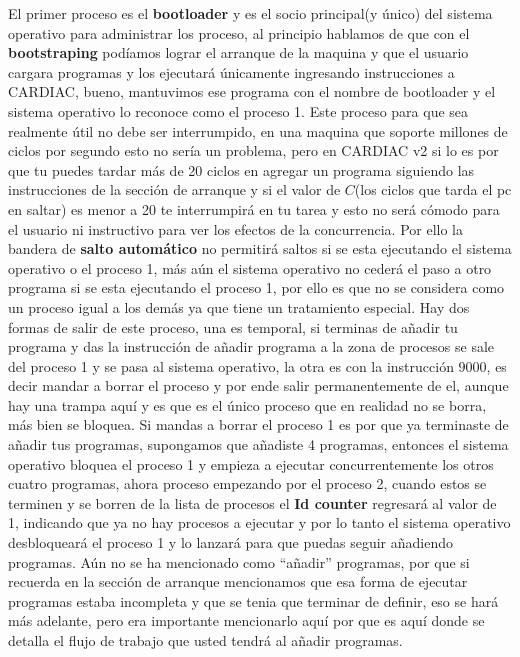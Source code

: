 \documentclass[12pt]{article}
\begin{document}
	El primer proceso es el \textbf{bootloader} y es el socio principal(y único) del sistema operativo para administrar
	los proceso, al principio hablamos de que con el \textbf{bootstraping} podíamos lograr el arranque de la maquina y
	que el usuario cargara programas y los ejecutará únicamente ingresando instrucciones a CARDIAC, bueno, mantuvimos
	ese programa con el nombre de bootloader y el sistema operativo lo reconoce como el proceso 1. Este proceso para que
	sea realmente útil no debe ser interrumpido, en una maquina que soporte millones de ciclos por segundo esto no sería un
	problema, pero en CARDIAC v2 si lo es por que tu puedes tardar más de 20 ciclos en agregar un programa siguiendo las instrucciones
	de la sección de arranque y si el valor de $C$(los ciclos que tarda el pc en saltar) es menor a 20 te interrumpirá en tu tarea
	y esto no será cómodo para el usuario ni instructivo para ver los efectos de la concurrencia. Por ello la bandera de 
	\textbf{salto automático} no permitirá saltos si se esta ejecutando el sistema operativo o el proceso 1, más aún el
	sistema operativo no cederá el paso a otro programa si se esta ejecutando el proceso 1, por ello es que no se considera
	como un proceso igual a los demás ya que tiene un tratamiento especial. Hay dos formas de salir de este proceso, una es
	temporal, si terminas de añadir tu programa y das la instrucción de añadir programa a la zona de procesos se sale del proceso 1
	y se pasa al sistema operativo, la otra es con la instrucción $9000$, es decir mandar a borrar el proceso y por ende salir
	permanentemente de el, aunque hay una trampa aquí y es que es el único proceso que en realidad no se borra, más bien
	se bloquea. Si mandas a borrar el proceso 1 es por que ya terminaste de añadir tus programas, supongamos que añadiste 4 programas,
	entonces el sistema operativo bloquea el proceso 1 y empieza a ejecutar concurrentemente los otros cuatro programas, ahora
	proceso empezando por el proceso 2, cuando estos se terminen y se borren de la lista de procesos el \textbf{Id counter}
	regresará al valor de 1, indicando que ya no hay procesos a ejecutar y por lo tanto el sistema operativo desbloqueará el
	proceso 1 y lo lanzará para que puedas seguir añadiendo programas. Aún no se ha mencionado como ``añadir'' programas, por
	que si recuerda en la sección de arranque mencionamos que esa forma de ejecutar programas estaba incompleta y que se tenia
	que terminar de definir, eso se hará más adelante, pero era importante mencionarlo aquí por que es aquí donde
	se detalla el flujo de trabajo que usted tendrá al añadir programas.
	
\end{document}
